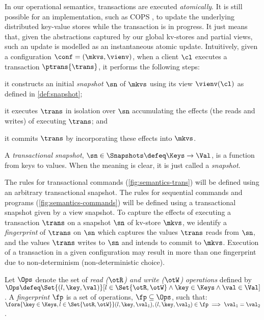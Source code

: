 In our operational semantics, transactions are executed
\emph{atomically}. It is still possible for an
implementation, such as COPS \cite{cops}, 
to update the underlying distributed key-value stores while
the transaction is in progress. It just means that, given the
abstractions captured by our global kv-stores and partial views, 
such an update is modelled as  an instantaneous  atomic
update.
Intuitively, given a configuration \(\conf = (\mkvs, \vienv)\), 
when a client \(\cl\) executes a transaction \(\ptrans{\trans}\), 
it performs the following steps: 
\begin{enumerate*}
	\item it constructs an initial \emph{snapshot} \(\sn\) of \(\mkvs\) using its view \(\vienv(\cl)\) as defined in \cref{def:snapshot};  
	\item it executes \(\trans\) in isolation over \(\sn\)
        accumulating the effects (the reads and writes) of executing \(\trans\); and
	\item it commits \(\trans\) by incorporating these effects into \(\mkvs\).
\end{enumerate*}

\SpaceAboveDef
\begin{definition}
\label{def:heaps}
A \emph{transactional snapshot}, \( \sn \in \Snapshots \defeq \Keys \to
\Val\),  is a function from keys to values. When the meaning is clear,
it is just called a {\em snapshot}. 
\end{definition}
\SpaceBelowDef

The rules for transactional commands (\cref{fig:semantics-trans}) will be defined  using an arbitrary 
transactional snapshot. The rules for sequential
commands and programs (\cref{fig:semantics-commands}) will be defined  using a transactional
snapshot given by a view snapshot. 
To capture the effects of executing a transaction \(\trans\) on a snapshot \(\sn\) of kv-store \(\mkvs\), 
we identify a \emph{fingerprint} of \(\trans\) on \(\sn\) which captures
 the values \(\trans\) reads from \(\sn\), and
the values \(\trans\) writes to \(\sn\) and intends to commit to \(\mkvs\). 
Execution of a transaction in a given configuration may result in more than one fingerprint due to non-determinism (non-deterministic choice). 

\SpaceAboveDef
\begin{definition}[Fingerprints]
\label{beebop}
\label{def:fingerprint}
Let \( \Ops\) denote the set of \emph{read (\( \otR\)) and write (\(\otW\)) operations} defined by 
\(\Ops \defeq \Set{(l, \key, \val) }[ l \in \Set{\otR, \otW} \land \key \in \Keys \land \val \in \Val ]\).
A \emph{fingerprint} \(\fp\) is a set of operations, \(\fp \subseteq \Ops\),
such that: 
\(\fora{\key \in \Keys, l  \in \Set{\otR, \otW}}
	(l, \key, \val_1), (l, \key, \val_2) \in \fp \implies \val_1 = \val_2\).
\end{definition}
\SpaceBelowDef

